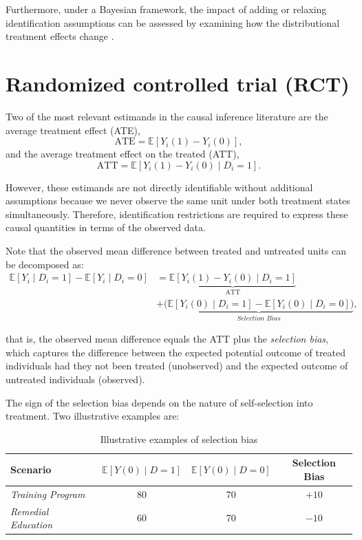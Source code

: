 Furthermore, under a Bayesian framework, the impact of adding or relaxing identification assumptions can be assessed by examining how the distributional treatment effects change \cite{imbens1997bayesian}.

\section{Randomized controlled trial (RCT)}\label{chap12_2}

Two of the most relevant estimands in the causal inference literature are the average treatment effect (ATE),
\[
\text{ATE} = \mathbb{E}[Y_i(1) - Y_i(0)],
\]
and the average treatment effect on the treated (ATT),
\[
\text{ATT} = \mathbb{E}[Y_i(1) - Y_i(0) \mid D_i = 1].
\]

However, these estimands are not directly identifiable without additional assumptions because we never observe the same unit under both treatment states simultaneously. Therefore, identification restrictions are required to express these causal quantities in terms of the observed data.

Note that the observed mean difference between treated and untreated units can be decomposed as:
\begin{align*}
\mathbb{E}[Y_i \mid D_i = 1] - \mathbb{E}[Y_i \mid D_i = 0] 
& = \underbrace{\mathbb{E}[Y_i(1) - Y_i(0) \mid D_i = 1]}_{\text{ATT}}\\
& + \underbrace{\Big( \mathbb{E}[Y_i(0) \mid D_i = 1] - \mathbb{E}[Y_i(0) \mid D_i = 0]\Big)}_{\textit{Selection Bias}},
\end{align*}

that is, the observed mean difference equals the ATT plus the \textit{selection bias}, which captures the difference between the expected potential outcome of treated individuals had they not been treated (unobserved) and the expected outcome of untreated individuals (observed). 

The sign of the selection bias depends on the nature of self-selection into treatment. Two illustrative examples are:

\begin{table}[H]
	\caption{Illustrative examples of selection bias}
	\begin{minipage}{0.5\textwidth} %
		
		\begin{tabular}{lccc}
			\hline
			\textbf{Scenario} & $\mathbb{E}[Y(0)\mid D=1]$ & $\mathbb{E}[Y(0)\mid D=0]$ & Selection Bias \\
			\hline
			\textit{Training Program} & 80 & 70 & $+10$ \\
			\textit{Remedial Education} & 60 & 70 & $-10$ \\
			\hline
		\end{tabular}
	\end{minipage}
\end{table}

